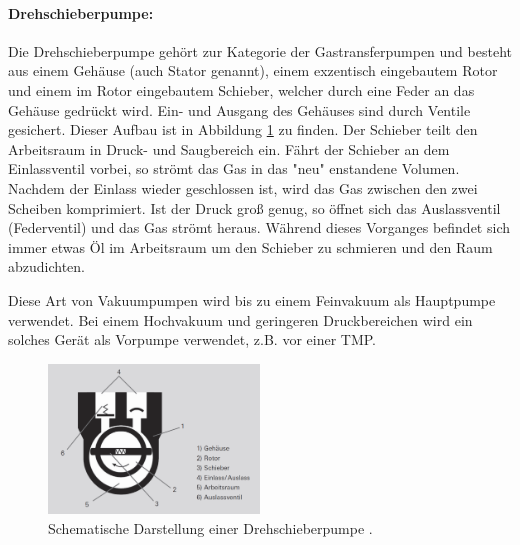  \paragraph{Drehschieberpumpe:}
 Die Drehschieberpumpe gehört zur Kategorie der Gastransferpumpen und besteht aus einem Gehäuse (auch Stator genannt), einem
 exzentisch eingebautem Rotor und einem im Rotor eingebautem Schieber, welcher durch eine Feder an das Gehäuse gedrückt wird.
 Ein- und Ausgang des Gehäuses sind durch Ventile gesichert. Dieser Aufbau ist in Abbildung \ref{fig:DSP} zu finden.
 Der Schieber teilt den Arbeitsraum in Druck- und Saugbereich ein. Fährt der Schieber an dem Einlassventil vorbei, so strömt
 das Gas in das "neu" enstandene Volumen. Nachdem der Einlass wieder geschlossen ist, wird das Gas zwischen den zwei Scheiben komprimiert.
 Ist der Druck groß genug, so öffnet sich das Auslassventil (Federventil) und das Gas strömt heraus. Während dieses Vorganges
 befindet sich immer etwas Öl im Arbeitsraum um den Schieber zu schmieren und den Raum abzudichten.

 Diese Art von Vakuumpumpen wird bis zu einem Feinvakuum als Hauptpumpe verwendet. Bei einem Hochvakuum und geringeren Druckbereichen wird
 ein solches Gerät als Vorpumpe verwendet, z.B. vor einer TMP.

 \begin{figure}
   \centering
   \includegraphics[width=0.5\textwidth]{Drehschieberpumpe.png}
   \caption{Schematische Darstellung einer Drehschieberpumpe \cite{DSP}.}
   \label{fig:DSP}
 \end{figure}

